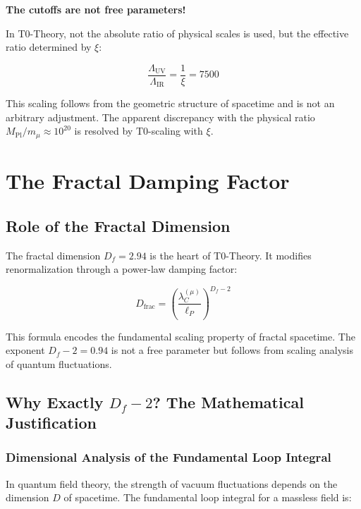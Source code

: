 \documentclass[12pt,a4paper]{article}
\theoremstyle{definition}
\begin{document}
	\begin{tcolorbox}[colback=blue!5!white,colframe=blue!75!black]
		\textbf{The cutoffs are not free parameters!}
	\end{tcolorbox}
	
	In T0-Theory, not the absolute ratio of physical scales is used, but the effective ratio determined by $\xi$:
	
	\begin{equation}
		\frac{\Lambda_{\text{UV}}}{\Lambda_{\text{IR}}} = \frac{1}{\xi} = 7500
	\end{equation}
	
	This scaling follows from the geometric structure of spacetime and is not an arbitrary adjustment. The apparent discrepancy with the physical ratio $M_{\text{Pl}}/m_\mu \approx 10^{20}$ is resolved by T0-scaling with $\xi$.
	
	\section{The Fractal Damping Factor}
	
	\subsection{Role of the Fractal Dimension}
	
	The fractal dimension $D_f = 2.94$ is the heart of T0-Theory. It modifies renormalization through a power-law damping factor:
	
	\begin{equation}
		D_{\text{frac}} = \left(\frac{\lambda_C^{(\mu)}}{\ell_P}\right)^{D_f - 2}
	\end{equation}
	
	This formula encodes the fundamental scaling property of fractal spacetime. The exponent $D_f - 2 = 0.94$ is not a free parameter but follows from scaling analysis of quantum fluctuations.
	
	\subsection{Why Exactly $D_f - 2$? The Mathematical Justification}
	
	\subsubsection{Dimensional Analysis of the Fundamental Loop Integral}
	
	In quantum field theory, the strength of vacuum fluctuations depends on the dimension $D$ of spacetime. The fundamental loop integral for a massless field is:
	
\end{document}
